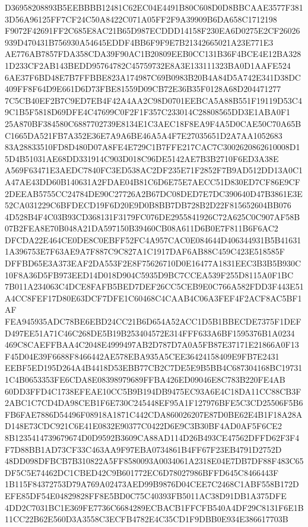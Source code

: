 \documentclass[UTF8,fontset=fandol,zihao=-4,a4paper]{ctexart}
\begin{document}
{{D36958208893B5EEBBBB12481C62EC04E4491B80C608D0D8BBCAAE3577F3813D56A96125FF7CF24C50A8422C071A05FF2F9A39909B6DA658C1712198
F9072F42691FF2C685E8AC21B65D987ECDDD14158F230EA6D0275E2CF26026939D470431B756930A54645EDDF4BB6F9F9E7B21342665021A23E771E3
AE776AB7857FDA358CDA39F90AC1B20809EEB0CC131B36F4BCE4E12BA3281D233CF2AB143BEDD95764782C45759732E8A3E133111323BA0D1AAFE524
6AE37F6BD48E7B7FFBBE823A174987C69B0983B20B4A84D5A742E341D38DC409FF8F64D9E661D6D73FBE81559D09CB72E36B35F0128A68D204471277
7C5CB40EF2B7C9ED7EB4F42A4AA2C98D0701EEBCA5A88B551F19119D53C49C1B5F5818D69DFE4C47699C0F2F1F357C233014C28808565DD3E1ABA0F1
25A870BF384580C6887702739E8134E1C3AEC18F8EA9F4A5D0CAE50C70A65BC1665DA521FB7A352E36E7A9A6BE46A5A4F7E27035651D2A7AA1052683
83A28833510FD8D480D07A8FE4E729C1B7FFE217CAC7C3002620862610008D15D4B51031AE68DD331914C903D018C96DE5142AE7B3B2710F6ED3A38E
A569F63471E3AEDC7840FC3ED538AC2DF235E71F2852F7B9AD512DD13A0C1A47AE43DD60B140631A2FDAE04B81C6D6E75E7AECC51D830ED7CF86E9CF
2DEEAB5755CC24784DE90C27726A2B67DC08DED7E7DC390640D47B3861E3E52CA031229C6BFDECD19F6D20E9D0B8BB7DB728B2D22F815652604BB076
4D528B4F4C03B93CD368131F3179FC076DE2955841926C72A625C0C907AF58B07B2FEA8E70B048A21DA597150B39460CB08A611D6B0E7F811B6F6AC2
DFCDA22E464CE0DE8C0EBFF52FC4A957CAC0E084644D406344931B5B416311A396753E7F63AE9A7F887C9C827A1C1917DAF6AB88C459C423E518585F
DFFBD65E3A373EAF2DA553F2E8F75626710D0E16477A1831EEC3B3B5B930C10F8A36D5FB973EED14D018D904C5935D9BC7CCEA539F255D8115A0F1BC
7B011A234063C4DCE8FAFB5BED7DEF26CC5CEB9E0C766A582FDD3F443E51A4CC8FEF17D80E63DCF7DFE1C60468C4CAAB4C06A3FEF4F2ACF8AC5BF1AF
FEA945935ADC78BE6EBD24CC21B6D654A52ACC1D5B1BBECDE7375F1DEFD497EE51A71C46C268DE5B19B253404572E314FFF633A6BF1595376B1A0234
469C8CAEFFBAA4C2048E4999497AB2D787D7A0A5FB87E37171E21866A0F13F45D04E39F6688F8466442AE578EBA935A5CEE36424158409E9FB7E2431
EEBF5ED195D264A4B4418D53EBB77CB2C7DE5E9B5BB4C687304168BC197311C4B0653353FE6CDA8E08398979689FFBA426ED09046E8C783B220FE4AB
60DD3FFD4C1738EFEAE10CC5B9B194DB9475EC93A6E4C18DA11CC88CB3F2ABC1C7CD4DA98CEB1F6E730C245448EF95A1F127976BFE5C3CD25506F5B6
FB6FAE7886D54496F08918A1871C442CDA860026207E87D0BE62E4B1F18A28AD148E73CDC921C6E41E0832E90377C0422D6E9C3B30BF4AD0AF5F6CE2
8B1235414739679674D0D9592B3609CA88AD114D26B493CE47562DFFD62F3F4F7D88BB1AD73CF33C463AA9F97EBA0734861B4FF67F23EB4791D2752D
48DD098DFBCB7B310822A5FF8580093A0034061A2318E04E7DB7DF88F483C65DF5C5E74462DC1CBED42C9B601772EC6D78027986BFFD645C8466443F
1B115F84372753D79A769A02473AED99B9876D04CEE7C2468C1ABF558B172DEFE85DF54E04829828FF8E5BD0C75C40393FB5011AC38D91DB1A375DFE
4DD2C7031BC1E369FE7736C6684289ECBACB1FFCFB540A4DF29C8131F6E1B11CC22B62E560D3A3558C3ECFB4782E4C35CD1F9DBB0E934E386617703B
}}
\end{document}

